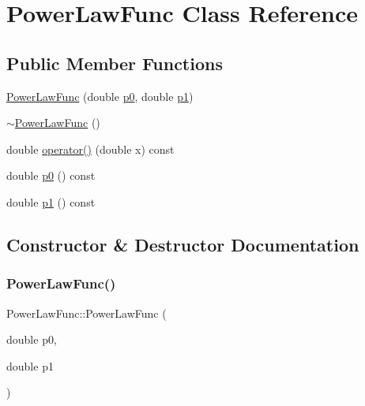 \hypertarget{classPowerLawFunc}{}\section{Power\+Law\+Func Class Reference}
\label{classPowerLawFunc}
\subsection*{Public Member Functions}
\begin{DoxyCompactItemize}
\item 
\mbox{\hyperlink{classPowerLawFunc_a9b7b99c69d48448d65f76d7cc2ba3dfc}{Power\+Law\+Func}} (double \mbox{\hyperlink{classPowerLawFunc_aa1eab94d7a8d404080ed25fde7dbd889}{p0}}, double \mbox{\hyperlink{classPowerLawFunc_a99c19d6a15b5efa68b17875afc619b08}{p1}})
\item 
\mbox{\hyperlink{classPowerLawFunc_a596daf259340179e1b3dc82e00569135}{$\sim$\+Power\+Law\+Func}} ()
\item 
double \mbox{\hyperlink{classPowerLawFunc_a39c1ca06f0f0f4b7874be6fe8c67f3e3}{operator()}} (double x) const
\item 
double \mbox{\hyperlink{classPowerLawFunc_aa1eab94d7a8d404080ed25fde7dbd889}{p0}} () const
\item 
double \mbox{\hyperlink{classPowerLawFunc_a99c19d6a15b5efa68b17875afc619b08}{p1}} () const
\end{DoxyCompactItemize}


\subsection{Constructor \& Destructor Documentation}
\mbox{\label{classPowerLawFunc_a9b7b99c69d48448d65f76d7cc2ba3dfc}} 
\subsubsection{\texorpdfstring{PowerLawFunc()}{PowerLawFunc()}}
{\footnotesize\ttfamily Power\+Law\+Func\+::\+Power\+Law\+Func (\begin{DoxyParamCaption}\item[{double}]{p0,  }\item[{double}]{p1 }\end{DoxyParamCaption})\hspace{0.3cm}{\ttfamily [inline]}}

